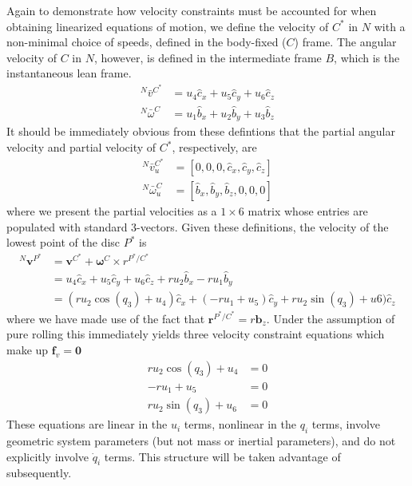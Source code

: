 \documentclass[smallcondensed,final]{svjour3}                     %
\begin{document}
Again to demonstrate how velocity constraints must be accounted for when
obtaining linearized equations of motion, we define the velocity of $C^*$ in
$N$ with a non-minimal choice of speeds, defined in the body-fixed ($C$) frame.
The angular velocity of $C$ in $N$, however, is defined in the intermediate
frame $B$, which is the instantaneous lean frame.
\begin{align}
  \label{v_u}
  {^N}\bar{v}^{C^*} &= u_4 \hat{c}_x + u_5 \hat{c}_y + u_6 \hat{c}_z \\
  \label{w_u}
  {^N}\bar{\omega}^C &= u_1 \hat{b}_x + u_2 \hat{b}_y + u_3 \hat{b}_z
\end{align}
It should be immediately obvious from these defintions that the partial angular
velocity and partial velocity of $C^*$, respectively, are
\begin{align}
  {^N}\bar{v}^{C^*}_u &= [0, 0, 0, \hat{c}_x, \hat{c}_y, \hat{c}_z] \\
  {^N}\bar{\omega}^C_u &= [\hat{b}_x, \hat{b}_y, \hat{b}_z, 0, 0, 0] 
\end{align}
where we present the partial velocities as a $1\times6$ matrix whose entries
are populated with standard 3-vectors. Given these definitions, the velocity of
the lowest point of the disc $P^*$ is
\begin{align*}
    {^N}\bm{v}^{P^*} &= \bm{v}^{C^*} + \bm{\omega}^{C} \times r^{P^*/C^*} \\
                     &= u_4\hat{c}_x + u_5\hat{c}_y + u_6\hat{c}_z + r u_2
                        \hat{b}_x - r u_1 \hat{b}_y \\
                     &= (r u_2 \cos(q_3) + u_4) \hat{c}_x + (-r
                        u_1 + u_5)\hat{c}_y + r u_2 \sin(q_3) +
                        u6) \hat{c}_z
\end{align*}
where we have made use of the fact that $\bm{r}^{P^*/C^*} = r\bm{b}_z$.
Under the assumption of pure rolling this immediately yields three velocity
constraint equations which make up $\mathbf{f}_v = \mathbf{0}$
\begin{subequations}
\label{rd:f_v}
\begin{align}
    r u_2 \cos(q_3) + u_4 &= 0\\
            -r u_1 + u_5 &= 0\\
    r u_2 \sin(q_3) + u_6 &= 0
\end{align}
\end{subequations}
These equations are linear in the $u_i$ terms, nonlinear in the $q_i$ terms,
involve geometric system parameters (but not mass or inertial parameters), and
do not explicitly involve $\dot{q}_i$ terms. This structure will be taken
advantage of subsequently.
\end{document}
